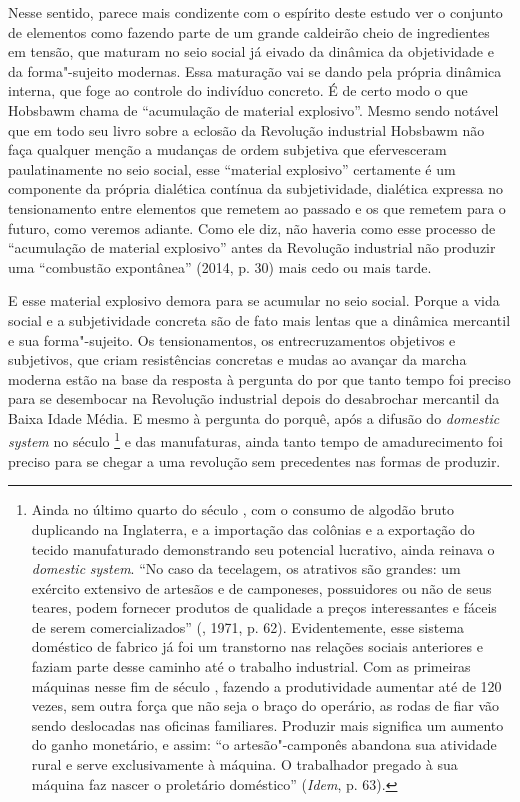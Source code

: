 Nesse sentido, parece mais condizente com o espírito deste estudo ver o
conjunto de elementos como fazendo parte de um grande caldeirão cheio de
ingredientes em tensão, que maturam no seio social já eivado da dinâmica
da objetividade e da forma"-sujeito modernas. Essa maturação vai se dando
pela própria dinâmica interna, que foge ao controle do indivíduo
concreto. É de certo modo o que Hobsbawm chama de ``acumulação de
material explosivo''. Mesmo sendo notável que em todo seu livro sobre a
eclosão da Revolução industrial Hobsbawm não faça qualquer menção a
mudanças de ordem subjetiva que efervesceram paulatinamente no seio
social, esse ``material explosivo'' certamente é um componente da
própria dialética contínua da subjetividade, dialética expressa no
tensionamento entre elementos que remetem ao passado e os que remetem
para o futuro, como veremos adiante. Como ele diz, não haveria como esse
processo de ``acumulação de material explosivo'' antes da Revolução
industrial não produzir uma ``combustão expontânea'' (2014, p. 30) mais
cedo ou mais tarde.

E esse material explosivo demora para se acumular no seio social. Porque
a vida social e a subjetividade concreta são de fato mais lentas que a
dinâmica mercantil e sua forma"-sujeito. Os tensionamentos, os
entrecruzamentos objetivos e subjetivos, que criam resistências concretas
e mudas ao avançar da marcha moderna estão na base da resposta à
pergunta do por que tanto tempo foi preciso para se desembocar na
Revolução industrial depois do desabrochar mercantil da Baixa Idade
Média. E mesmo à pergunta do porquê, após a difusão do \emph{domestic system} no
século \footnote{Ainda no último quarto do século , com o
  consumo de algodão bruto duplicando na Inglaterra, e a importação das
  colônias e a exportação do tecido manufaturado demonstrando seu
  potencial lucrativo, ainda reinava o \emph{domestic} \emph{system}.
  ``No caso da tecelagem, os atrativos são grandes: um exército
  extensivo de artesãos e de camponeses, possuidores ou não de seus
  teares, podem fornecer produtos de qualidade a preços interessantes e
  fáceis de serem comercializados'' (, 1971, p. 62).
  Evidentemente, esse sistema doméstico de fabrico já foi um transtorno
  nas relações sociais anteriores e faziam parte desse caminho até o
  trabalho industrial. Com as primeiras máquinas nesse fim de século
  , fazendo a produtividade aumentar até de 120 vezes, sem outra
  força que não seja o braço do operário, as rodas de fiar vão sendo
  deslocadas nas oficinas familiares. Produzir mais significa um aumento
  do ganho monetário, e assim: ``o artesão"-camponês abandona sua
  atividade rural e serve exclusivamente à máquina. O trabalhador
  pregado à sua máquina faz nascer o proletário doméstico''
  (\emph{Idem}, p. 63).} e das manufaturas, ainda tanto tempo de
amadurecimento foi preciso para se chegar a uma revolução sem
precedentes nas formas de produzir.

